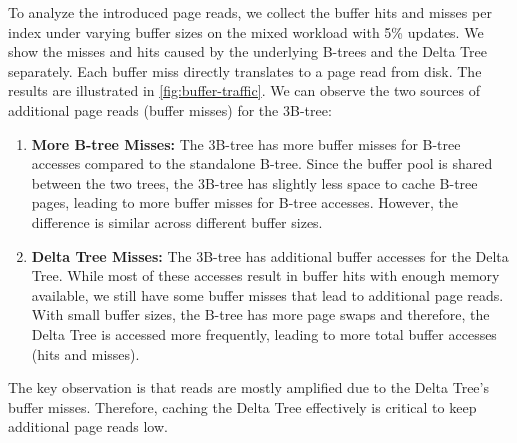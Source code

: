To analyze the introduced page reads, we collect the buffer hits and misses per index under varying buffer sizes on the mixed workload with 5\% updates.
We show the misses and hits caused by the underlying B-trees and the Delta Tree separately.
Each buffer miss directly translates to a page read from disk.
The results are illustrated in \autoref{fig:buffer-traffic}.
We can observe the two sources of additional page reads (buffer misses) for the 3B-tree:
\begin{enumerate}
  \item \textbf{More B-tree Misses:} 
  The 3B-tree has more buffer misses for B-tree accesses compared to the standalone B-tree.
  Since the buffer pool is shared between the two trees, the 3B-tree has slightly less space to cache B-tree pages, leading to more buffer misses for B-tree accesses.
  However, the difference is similar across different buffer sizes.
  \item \textbf{Delta Tree Misses:} 
  The 3B-tree has additional buffer accesses for the Delta Tree.
  While most of these accesses result in buffer hits with enough memory available, we still have some buffer misses that lead to additional page reads.
  With small buffer sizes, the B-tree has more page swaps and therefore, the Delta Tree is accessed more frequently, leading to more total buffer accesses (hits and misses).
\end{enumerate}

The key observation is that reads are mostly amplified due to the Delta Tree's buffer misses.
Therefore, caching the Delta Tree effectively is critical to keep additional page reads low.

